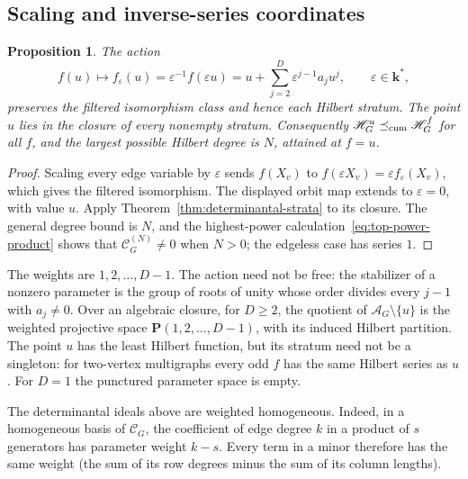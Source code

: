 \documentclass[reqno]{article}
\theoremstyle{plain} %
\newtheorem{proposition}[theorem]{Proposition}
\theoremstyle{definition}
\theoremstyle{remark}
\newcommand{\K} {\mathbf{k}}
\renewcommand{\P} {\mathbf{P}}
\newcommand {\CC}{\mathscr{C}}
\newcommand{\cA}{{\mathscr{A}}}
\newcommand{\hs}{\mathscr{H}}
\numberwithin{equation}{section}
\begin{document}
\subsection{Scaling and inverse-series coordinates}
\label{sec:scaling}

\begin{proposition}\label{prop:scaling}
The action
\begin{equation}\label{eq:action}
f(u)\longmapsto f_\varepsilon(u)=\varepsilon^{-1}f(\varepsilon u)
=u+\sum_{j=2}^D\varepsilon^{j-1}a_ju^j,
\qquad \varepsilon\in\K^*,
\end{equation}
preserves the filtered isomorphism class and hence each Hilbert stratum.
The point $u$ lies in the closure of every nonempty stratum. Consequently
$\hs_G^u\preceq_{\rm cum}\hs_G^f$ for all $f$, and the largest possible
Hilbert degree is $N$, attained at $f=u$.
\end{proposition}
\begin{proof}
Scaling every edge variable by $\varepsilon$ sends $f(X_v)$ to
$f(\varepsilon X_v)=\varepsilon f_\varepsilon(X_v)$, which gives the
filtered isomorphism. The displayed orbit map extends to
$\varepsilon=0$, with value $u$. Apply Theorem~\ref{thm:determinantal-strata} to its
closure. The general degree bound is $N$, and the highest-power
calculation~\eqref{eq:top-power-product} shows that $\CC_G^{(N)}\ne0$
when $N>0$; the edgeless case has series $1$.
\end{proof}

The weights are $1,2,\ldots,D-1$. The action need not be free: the
stabilizer of a nonzero parameter is the group of roots of unity whose
order divides every $j-1$ with $a_j\ne0$. Over an algebraic closure, for $D\ge2$,
the quotient of $\cA_G\setminus\{u\}$ is the weighted projective space
$\P(1,2,\ldots,D-1)$, with its induced Hilbert partition.
The point $u$ has the least Hilbert function, but its stratum need not be
a singleton: for two-vertex multigraphs every odd $f$ has the same
Hilbert series as $u$. For $D=1$ the punctured parameter space is empty.

The determinantal ideals above are weighted homogeneous. Indeed, in a
homogeneous basis of $\CC_G$, the coefficient of edge degree $k$ in a
product of $s$ generators has parameter weight $k-s$. Every term in a
minor therefore has the same weight (the sum of its row degrees minus
the sum of its column lengths).
\end{document}

